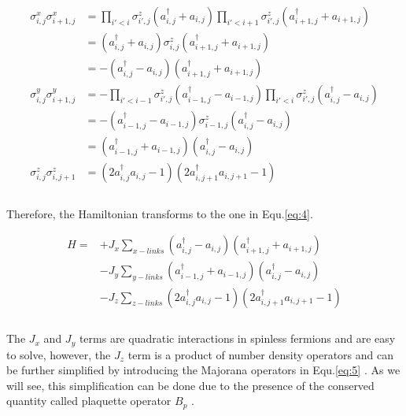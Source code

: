 \documentclass{article}
\begin{document}
\begin{equation}\label{eq:3}
	\begin{aligned}
		\sigma^{x}_{i,j}\sigma^{x}_{i+1,j} &= \prod_{i'<i}\sigma^z_{i',j} (a^{\dagger}_{i,j} + a_{i,j}) \prod_{i'<i+1}\sigma^z_{i',j} (a^{\dagger}_{i+1,j} + a_{i+1,j})\\
		&= (a^{\dagger}_{i,j} + a_{i,j}) \sigma^z_{i,j} (a^{\dagger}_{i+1,j} + a_{i+1,j})\\
		&= -(a^{\dagger}_{i,j} - a_{i,j}) (a^{\dagger}_{i+1,j} + a_{i+1,j})\\
		\sigma^{y}_{i,j}\sigma^{y}_{i+1,j} &= -\prod_{i'<i-1}\sigma^z_{i',j} (a^{\dagger}_{i-1,j} - a_{i-1,j}) \prod_{i'<i}\sigma^z_{i',j} (a^{\dagger}_{i,j} - a_{i,j})\\
		&= -(a^{\dagger}_{i-1,j} - a_{i-1,j}) \sigma^z_{i-1,j} (a^{\dagger}_{i,j} - a_{i,j})\\
		&= (a^{\dagger}_{i-1,j} + a_{i-1,j}) (a^{\dagger}_{i,j} - a_{i,j})\\
		\sigma^{z}_{i,j}\sigma^{z}_{i,j+1} &=  (2a^{\dagger}_{i,j}a_{i,j} - 1) (2a^{\dagger}_{i,j+1}a_{i,j+1} - 1)\\
	\end{aligned}
\end{equation}\\

\noindent Therefore, the Hamiltonian transforms to the one in Equ.\hspace{0.2mm}\ref{eq:4}. 

\begin{equation}\label{eq:4}
	\begin{aligned}
		H= &+J_x \sum_{x-links} (a^{\dagger}_{i,j} - a_{i,j}) (a^{\dagger}_{i+1,j} + a_{i+1,j})\\
		&-J_y \sum_{y-links} (a^{\dagger}_{i-1,j} + a_{i-1,j}) (a^{\dagger}_{i,j} - a_{i,j})\\
		&-J_z \sum_{z-links} (2a^{\dagger}_{i,j}a_{i,j} - 1) (2a^{\dagger}_{i,j+1}a_{i,j+1} - 1)\\
	\end{aligned}
\end{equation}\\

\noindent The $J_x$ and $J_y$ terms are quadratic interactions in spinless fermions and are easy to solve, however, the $J_z$ term is a product of number density operators and can be further simplified by introducing the Majorana operators in Equ.\hspace{0.2mm}\ref{eq:5} \cite{Schmoll_2017}. As we will see, this simplification can be done due to the presence of the conserved quantity called plaquette operator $B_p$ \cite{Schmoll_2017}. 
\end{document}
